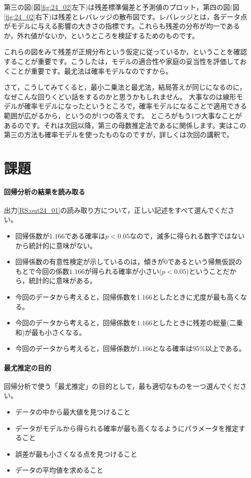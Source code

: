 \documentclass{ltjbook}
\begin{document}
第三の図(図\ref{fig:24_02}左下)は残差標準偏差と予測値のプロット，第四の図(図\ref{fig:24_02}右下)は残差とレバレッジの散布図です。レバレッジとは，各データ点がモデルに与える影響の大きさの指標です。これらも残差の分布が均一であるか，外れ値がないか，というところを検証するためのものです。

これらの図をみて残差が正規分布という仮定に従っているか，ということを確認することが重要です。こうしたは，モデルの適合性や家庭の妥当性を評価しておくことが重要です。最尤法は確率モデルなのですから。

さて，こうしてみてくると，最小二乗法と最尤法，結局答えが同じになるのに，なぜこんな回りくどい話をするのかと思うかもしれません。
大事なのは線形モデルが確率モデルになったというところで，確率モデルになることで適用できる範囲が広がるから，というのが1つの答えです。
ところがもう1つ大事なことがあるのです。それは次回以降，第三の母数推定法であるに関係します。実はこの第三の方法も確率モデルを使ったものなのですが，詳しくは次回の講釈で。

\section{課題}
\paragraph{回帰分析の結果を読み取る}出力\ref{RS:out24_01}の読み取り方について，正しい記述をすべて選んでください。
\begin{itemize}
	\item 回帰係数が$1.166$である確率は$p<0.05$なので，滅多に得られる数字ではないから統計的に意味がない。
	\item 回帰係数の有意性検定が示しているのは，傾きが0であるという帰無仮説のもとで今回の係数$1.166$が得られる確率が小さい($p<0.05$)ということだから，統計的に意味がある。
	\item 今回のデータから考えると，回帰係数を$1.166$としたときに尤度が最も高くなる。
	\item 今回のデータから考えると，回帰係数を$1.166$としたときに残差の総量(二乗和)が最も小さくなる。
	\item 今回のデータから考えると，回帰係数が$1.166$となる確率は95\%以上である。
\end{itemize}

\paragraph{最尤推定の目的}
回帰分析で使う「最尤推定」の目的として，最も適切なものを一つ選んでください。
\begin{itemize}
	\item データの中から最大値を見つけること
	\item データがモデルから得られる確率が最も高くなるようにパラメータを推定すること
	\item 誤差が最も小さくなる点を見つけること
	\item データの平均値を求めること
\end{itemize}
\end{document}
